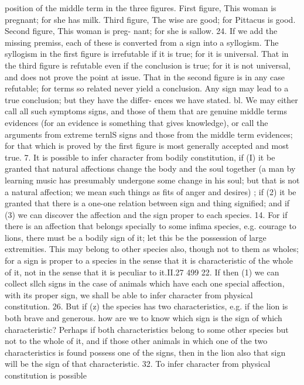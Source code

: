 {{{{{{{{{{{{{{{{{{{{{{{{{{{{{position of the middle term in the three figures. First figure, This
woman is pregnant; for she has milk. Third figure, The wise are
good; for Pittacus is good. Second figure, This woman is preg-
nant; for she is sallow.
24. If we add the missing premiss, each of these is converted
from a sign into a syllogism. The syllogism in the first figure is
irrefutable if it is true; for it is universal. That in the third figure
is refutable even if the conclusion is true; for it is not universal,
and does not prove the point at issue. That in the second figure is
in any case refutable; for terms so related never yield a conclusion.
Any sign may lead to a true conclusion; but they have the differ-
ences we have stated.
bl. We may either call all such symptoms signs, and those of
them that are genuine middle terms evidences (for an evidence
is something that gives knowledge), or call the arguments from
extreme ternlS signs and those from the middle term evidences;
for that which is proved by the first figure is most generally
accepted and most true.
7. It is possible to infer character from bodily constitution, if
(I) it be granted that natural affections change the body and the
soul together (a man by learning music has presumably undergone
some change in his soul; but that is not a natural affection; we
mean such things as fits of anger and desires) ; if (2) it be granted
that there is a one-one relation between sign and thing signified;
and if (3) we can discover the affection and the sign proper to each
species.
14. For if there is an affection that belongs specially to some
infima species, e.g. courage to lions, there must be a bodily sign of
it; let this be the possession of large extremities. This may belong
to other species also, though not to them as wholes; for a sign is
proper to a species in the sense that it is characteristic of the
whole of it, not in the sense that it is peculiar to it.II.27
499
22. If then (1) we can collect sllch signs in the case of animals
which have each one special affection, with its proper sign, we
shall be able to infer character from physical constitution.
26. But if (z) the species has two characteristics, e.g. if the lion
is both brave and generous. how are we to know which sign is the
sign of which characteristic? Perhaps if both characteristics
belong to some other species but not to the whole of it, and if
those other animals in which one of the two characteristics is
found possess one of the signs, then in the lion also that sign will
be the sign of that characteristic.
32. To infer character from physical constitution is possible
}}}}}}}}}}}}}}}}}}}}}}}}}}}}}
